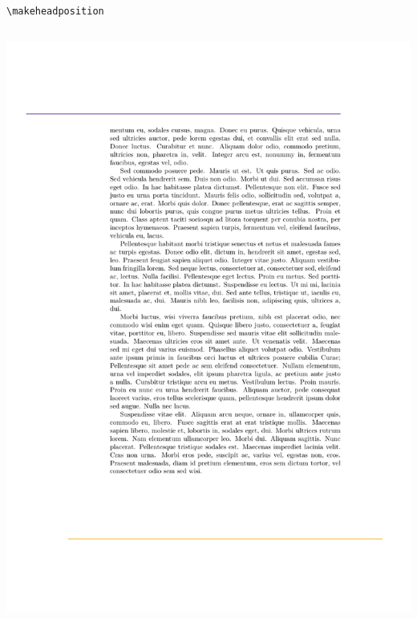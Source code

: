 \documentclass{beamer}
\begin{document}
\begin{frame}[fragile]{\texttt{\textbackslash makeheadposition}}
\begin{columns}
\begin{column}{0.4\textwidth}
\begin{overprint}
        \includegraphics[frame,width=\linewidth]{demo-hp-2}
      \end{overprint}
    \end{column}
  \end{columns}
\end{frame}
\end{document}
